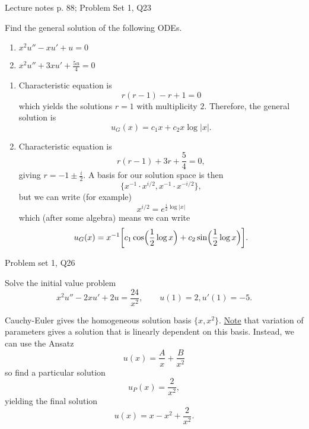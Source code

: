 \begin{problem}{Lecture notes p. 88; Problem Set 1, Q23}{}


    Find the general solution of the following ODEs.

    \begin{enumerate}
        \item $x^2 u'' - x u' + u = 0$
        \item $x^2 u'' + 3x u' + \frac{5u}{4} = 0$
    \end{enumerate}

    \tcblower

    \begin{enumerate}
        \item {} Characteristic equation is
            $$ r(r - 1) - r  + 1 = 0 $$
        which yields the solutions $r = 1$ with multiplicity $2$. Therefore, the general solution is
            $$ u_G(x) = c_1 x + c_2 x \log \lvert x \rvert . $$
        \item {} Characteristic equation is
            $$ r(r - 1) + 3r + \frac{5}{4} = 0 , $$
        giving $r = -1 \pm \frac{i}{2}$. A basis for our solution space is then
            $$ \{ x^{-1} \cdot x^{i/2},
                x^{-1} \cdot x^{-i/2} \} , $$
        but we can write (for example)
            $$ x^{i/2} = e^{\frac{i}{2} \log \lvert x \rvert} $$
        which (after some algebra) means we can write
            $$ u_G(x) = x^{-1} \biggl[
                c_1 \cos \Bigl( \frac{1}{2} \log x \Bigr)
                + c_2 \sin \Bigl( \frac{1}{2} \log x \Bigr)
                \biggr] . $$
    \end{enumerate}

\end{problem}

\begin{problem}{Problem set 1, Q26}{}


    Solve the initial value problem
        $$ x^2 u'' - 2xu' + 2u = \frac{24}{x^2},
            \qquad u(1) = 2, u'(1) = -5 . $$
    
    Cauchy-Euler gives the homogeneous solution basis $\{x, x^2\}$. \underline{Note} that variation of parameters gives a solution that is linearly dependent on this basis. Instead, we can use the Ansatz
        $$ u(x) = \frac{A}{x} + \frac{B}{x^2} $$
    so find a particular solution
        $$ u_P(x) = \frac{2}{x^2} , $$
    yielding the final solution
        $$ u(x) = x - x^2 + \frac{2}{x^2} . $$

\end{problem}